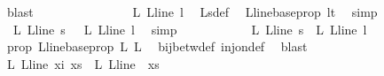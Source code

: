 \begin{isabellebody}
\ blast\isanewline
\ \ \ \ \ \ \ \ \isamarkupfalse%
\ \isamarkupfalse%
\ {\isachardoublequoteopen}\ {\isachardot}{\kern0pt}{\isachardot}{\kern0pt}{\isachardot}{\kern0pt}\ {\isacharequal}{\kern0pt}\ {\isasymphi}\ {\isacharparenleft}{\kern0pt}{\isasymchi}L\ {\isacharparenleft}{\kern0pt}L{\isacharunderscore}{\kern0pt}line\ l{\isacharparenright}{\kern0pt}{\isacharparenright}{\kern0pt}{\isachardoublequoteclose}\ \isamarkupfalse%
\ {\isasymchi}L{\isacharunderscore}{\kern0pt}s{\isacharunderscore}{\kern0pt}def\ \isamarkupfalse%
\ L{\isacharunderscore}{\kern0pt}line{\isacharunderscore}{\kern0pt}base{\isacharunderscore}{\kern0pt}prop\ {\isacartoucheopen}l{\isacharless}{\kern0pt}t{\isacartoucheclose}\ \isamarkupfalse%
\ simp\isanewline
\ \ \ \ \ \ \ \ \isamarkupfalse%
\ \isamarkupfalse%
\ {\isachardoublequoteopen}{\isasymphi}\ {\isacharparenleft}{\kern0pt}{\isasymchi}L\ {\isacharparenleft}{\kern0pt}L{\isacharunderscore}{\kern0pt}line\ s{\isacharparenright}{\kern0pt}{\isacharparenright}{\kern0pt}\ {\isacharequal}{\kern0pt}\ {\isasymphi}\ {\isacharparenleft}{\kern0pt}{\isasymchi}L\ {\isacharparenleft}{\kern0pt}L{\isacharunderscore}{\kern0pt}line\ l{\isacharparenright}{\kern0pt}{\isacharparenright}{\kern0pt}{\isachardoublequoteclose}\ \isamarkupfalse%
\ simp\isanewline
\ \ \ \ \ \ \ \ \isamarkupfalse%
\ \isamarkupfalse%
\ {\isachardoublequoteopen}{\isasymchi}L\ {\isacharparenleft}{\kern0pt}L{\isacharunderscore}{\kern0pt}line\ s{\isacharparenright}{\kern0pt}\ {\isacharequal}{\kern0pt}\ {\isasymchi}L\ {\isacharparenleft}{\kern0pt}L{\isacharunderscore}{\kern0pt}line\ l{\isacharparenright}{\kern0pt}{\isachardoublequoteclose}\ \isamarkupfalse%
\ {\isasymphi}{\isacharunderscore}{\kern0pt}prop\ L{\isacharunderscore}{\kern0pt}line{\isacharunderscore}{\kern0pt}base{\isacharunderscore}{\kern0pt}prop\ L{}\ L{}\ \isamarkupfalse%
\ bij{\isacharunderscore}{\kern0pt}betw{\isacharunderscore}{\kern0pt}def\ inj{\isacharunderscore}{\kern0pt}on{\isacharunderscore}{\kern0pt}def\ \isamarkupfalse%
\ blast\isanewline
\ \ \ \ \ \ \isamarkupfalse%
\isanewline
\ \ \ \ \ \ \isamarkupfalse%
\ \isamarkupfalse%
\ {\isachardoublequoteopen}{\isasymchi}L\ {\isacharparenleft}{\kern0pt}L{\isacharunderscore}{\kern0pt}line\ xi{\isacharparenright}{\kern0pt}\ xs\ {\isacharequal}{\kern0pt}\ {\isasymchi}L\ {\isacharparenleft}{\kern0pt}L{\isacharunderscore}{\kern0pt}line\ {}{\isacharparenright}{\kern0pt}\ xs{\isachardoublequoteclose}\ \isamarkupfalse%

\end{isabellebody}
